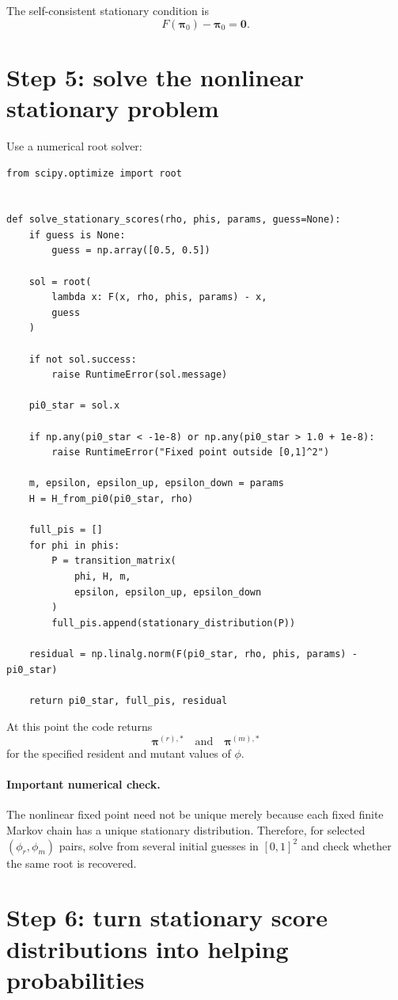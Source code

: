 \documentclass[11pt]{article}
\begin{document}
The self-consistent stationary condition is
\[
\boxed{
F(\bm{\pi}_0)-\bm{\pi}_0=\bm{0}.
}
\]

\section{Step 5: solve the nonlinear stationary problem}

Use a numerical root solver:

\begin{lstlisting}
from scipy.optimize import root


def solve_stationary_scores(rho, phis, params, guess=None):
    if guess is None:
        guess = np.array([0.5, 0.5])

    sol = root(
        lambda x: F(x, rho, phis, params) - x,
        guess
    )

    if not sol.success:
        raise RuntimeError(sol.message)

    pi0_star = sol.x

    if np.any(pi0_star < -1e-8) or np.any(pi0_star > 1.0 + 1e-8):
        raise RuntimeError("Fixed point outside [0,1]^2")

    m, epsilon, epsilon_up, epsilon_down = params
    H = H_from_pi0(pi0_star, rho)

    full_pis = []
    for phi in phis:
        P = transition_matrix(
            phi, H, m,
            epsilon, epsilon_up, epsilon_down
        )
        full_pis.append(stationary_distribution(P))

    residual = np.linalg.norm(F(pi0_star, rho, phis, params) - pi0_star)

    return pi0_star, full_pis, residual
\end{lstlisting}

At this point the code returns
\[
\bm{\pi}^{(r),*}
\quad\text{and}\quad
\bm{\pi}^{(m),*}
\]
for the specified resident and mutant values of $\phi$.

\paragraph{Important numerical check.}
The nonlinear fixed point need not be unique merely because each fixed finite Markov chain has a unique stationary distribution. Therefore, for selected $(\phi_r,\phi_m)$ pairs, solve from several initial guesses in $[0,1]^2$ and check whether the same root is recovered.

\section{Step 6: turn stationary score distributions into helping probabilities}
\end{document}
